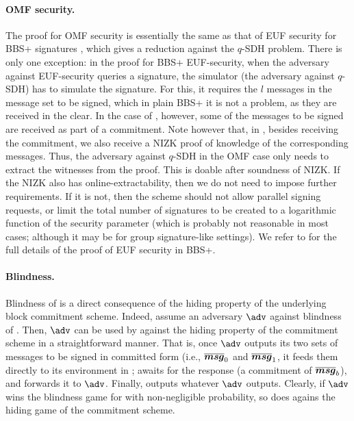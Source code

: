 \paragraph{OMF security.} The proof for OMF security is essentially the
same as that of EUF security for BBS+ signatures \cite{cdl16b}, which gives a
reduction against the $q$-SDH problem. There is only one exception: in the proof
for BBS+ EUF-security, when the adversary against EUF-security queries a
signature, the simulator (the adversary against $q$-SDH) has to simulate the
signature. For this, it requires the $l$ messages in the message set to be
signed, which in plain BBS+ it is not a problem, as they are received in the
clear. In the case of \SBCM, however, some of the messages to be signed are
received as part of a commitment. Note however that, in \SBCM, besides receiving
the commitment, we also receive a NIZK proof of knowledge of the corresponding
messages. Thus, the adversary against $q$-SDH in the OMF case only needs to
extract the witnesses from the proof. This is doable after soundness of NIZK.
If the NIZK also has online-extractability, then we do not need to impose
further requirements. If it is not, then the \SBCM scheme should not allow
parallel signing requests, or limit the total number of signatures to be
created to a logarithmic function of the security parameter (which is probably
not reasonable in most cases; although it may be for group signature-like
settings). We refer to \cite[Lemma 1]{cdl16b} for the full details of the proof
of EUF security in BBS+.
%

\paragraph{Blindness.} Blindness of \SBCM is a direct consequence of the
hiding property of the underlying block commitment scheme. Indeed, assume an
adversary $\adv$ against blindness of \SBCM. Then, $\adv$ can be used by
\advB against the hiding property of the commitment scheme in a straightforward
manner. That is, once $\adv$ outputs its two sets of messages to be signed in
committed form (i.e., $\overline{\boldsymbol{msg}}_0$ and $\overline{\boldsymbol{msg}}_1$, it feeds
them directly to its environment in \ExpComHideb; \advB awaits for the response
(a commitment of $\overline{\boldsymbol{msg}}_b$), and forwards it to $\adv$. Finally,
\advB outputs whatever $\adv$ outputs. Clearly, if $\adv$ wins the blindness
game for \SBCM with non-negligible probability, so does \advB agains the hiding
game of the commitment scheme.

